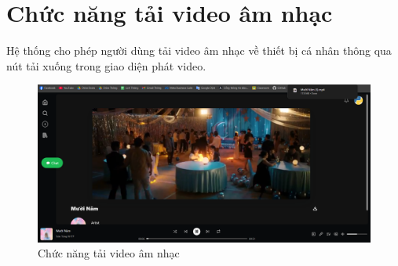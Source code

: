 \section{Chức năng tải video âm nhạc}
Hệ thống cho phép người dùng tải video âm nhạc về thiết bị cá nhân thông qua nút tải xuống trong giao diện phát video.

\begin{figure}[H]
    \centering
    \includegraphics[width=1\textwidth]{imgs/chap5/tai_video.png}
    \caption{Chức năng tải video âm nhạc}
\end{figure}